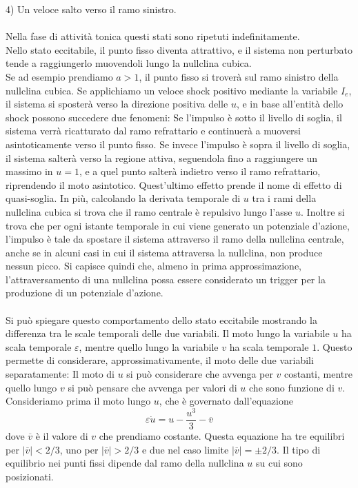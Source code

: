 \documentclass[12pt]{article}
\begin{document}
4) Un veloce salto verso il ramo sinistro.\\ \\
Nella fase di attività tonica questi stati sono ripetuti indefinitamente. \\
Nello stato eccitabile, il punto fisso diventa attrattivo, e il sistema non perturbato tende a raggiungerlo muovendoli lungo la nullclina cubica. \\
Se ad esempio prendiamo $a > 1$, il punto fisso si troverà sul ramo sinistro della nullclina cubica. Se applichiamo un veloce shock positivo mediante la variabile $I_e$, il sistema si sposterà verso la direzione positiva delle $u$, e in base all'entità dello shock possono succedere due fenomeni: Se l'impulso è sotto il livello di soglia, il sistema verrà ricatturato dal ramo refrattario e continuerà a muoversi asintoticamente verso il punto fisso. Se invece l'impulso è sopra il livello di soglia, il sistema salterà verso la regione attiva, seguendola fino a raggiungere un massimo in $u = 1$, e a quel punto salterà indietro verso il ramo refrattario, riprendendo il moto asintotico. Quest'ultimo effetto prende il nome di effetto di quasi-soglia. In più, calcolando la derivata temporale di $u$ tra i rami della nullclina cubica si trova che il ramo centrale è repulsivo lungo l'asse $u$. Inoltre si trova che per ogni istante temporale in cui viene generato un potenziale d'azione, l'impulso è tale da spostare il sistema attraverso il ramo della nullclina centrale, anche se in alcuni casi in cui il sistema attraversa la nullclina, non produce nessun picco. Si capisce quindi che, almeno in prima approssimazione, l'attraversamento di una nullclina possa essere considerato un trigger per la produzione di un potenziale d'azione. \\ \\
Si può spiegare questo comportamento dello stato eccitabile mostrando la differenza tra le scale temporali delle due variabili. Il moto lungo la variabile $u$ ha scala temporale $\varepsilon$, mentre quello lungo la variabile $v$ ha scala temporale $1$. Questo permette di considerare, approssimativamente, il moto delle due variabili separatamente: Il moto di $u$ si può considerare che avvenga per $v$ costanti, mentre quello lungo $v$ si può pensare che avvenga per valori di $u$ che sono funzione di $v$. Consideriamo prima il moto lungo $u$, che è governato dall'equazione 
$$
\varepsilon \dot{u} = u - \frac{u^3}{3} - \overline{v}
$$
dove $\overline{v}$ è il valore di $v$ che prendiamo costante. Questa equazione ha tre equilibri per $|\overline{v}|<2/3$, uno per $|\overline{v}|>2/3$ e due nel caso limite $|\overline{v}|= \pm 2/3$. Il tipo di equilibrio nei punti fissi dipende dal ramo della nullclina $u$ su cui sono posizionati. \\
\end{document}
